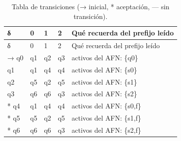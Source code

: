 \begin{longtable}[]{@{}lllll@{}}
\caption{Tabla de transiciones (→ inicial, * aceptación, --- sin transición).}\tabularnewline
\toprule\noalign{}
δ & 0 & 1 & 2 & Qué recuerda del prefijo leído \\
\midrule\noalign{}
\endfirsthead
\toprule\noalign{}
δ & 0 & 1 & 2 & Qué recuerda del prefijo leído \\
\midrule\noalign{}
\endhead
\bottomrule\noalign{}
\endlastfoot
→ q0 & q1 & q2 & q3 & activos del AFN: \{q0\} \\
q1 & q1 & q4 & q4 & activos del AFN: \{s0\} \\
q2 & q5 & q2 & q5 & activos del AFN: \{s1\} \\
q3 & q6 & q6 & q3 & activos del AFN: \{s2\} \\
* q4 & q1 & q4 & q4 & activos del AFN: \{s0,f\} \\
* q5 & q5 & q2 & q5 & activos del AFN: \{s1,f\} \\
* q6 & q6 & q6 & q3 & activos del AFN: \{s2,f\} \\
\end{longtable}

